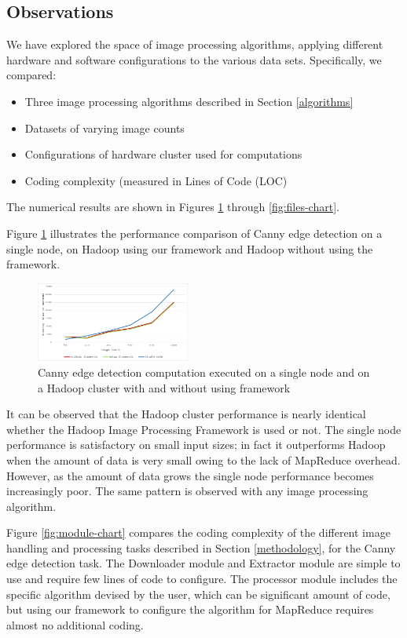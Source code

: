 \documentclass[conference]{IEEEtran}
\begin{document}
\subsection{Observations}   

We have explored the space of image processing algorithms, applying
different hardware and software configurations to the various data
sets.  Specifically, we compared:

\begin{itemize}
\item Three image processing algorithms described in Section
  \ref{algorithms}
\item Datasets of varying image counts
\item Configurations of hardware cluster used for computations 
\item Coding complexity (measured in Lines of Code (LOC)
\end{itemize}

The numerical results are shown in Figures \ref{fig:perf-chart}
through \ref{fig:files-chart}.

Figure \ref{fig:perf-chart} illustrates the performance comparison of
Canny edge detection on a single node, on Hadoop using our framework
and Hadoop without using the framework.

\begin{figure}[h]
  \centering
  \includegraphics[width=0.45\textwidth]{perf-graph}
  \caption{Canny edge detection computation executed on a single node
    and on a Hadoop cluster with and without using framework}
  \label{fig:perf-chart}
\end{figure}

It can be observed that the Hadoop cluster performance is nearly
identical whether the Hadoop Image Processing Framework is used or
not.  The single node performance is satisfactory on small input
sizes; in fact it outperforms Hadoop when the amount of data is very
small owing to the lack of MapReduce overhead.  However, as the amount
of data grows the single node performance becomes increasingly poor.
The same pattern is observed with any image processing algorithm.

Figure \ref{fig:module-chart} compares the coding complexity of the
different image handling and processing tasks described in Section
\ref{methodology}, for the Canny edge detection task. The Downloader
module and Extractor module are simple to use and require few lines of
code to configure. The processor module includes the specific
algorithm devised by the user, which can be significant amount of
code, but using our framework to configure the algorithm for MapReduce
requires almost no additional coding.
\end{document}
